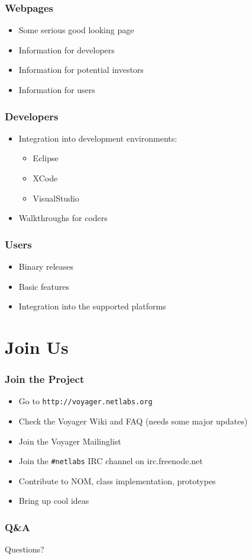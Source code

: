 \documentclass{beamer}
\begin{document}
\begin{frame}
\frametitle{Webpages}
\begin{itemize}
  \item Some serious good looking page
  \item Information for developers
  \item Information for potential investors
  \item Information for users
\end{itemize}
\end{frame}

\begin{frame}
\frametitle{Developers}
\begin{itemize}
  \item Integration into development environments:
  \begin{itemize}
    \item Eclipse
    \item XCode
    \item VisualStudio
  \end{itemize}
  \item Walkthroughs for coders 
\end{itemize}
\end{frame}

\begin{frame}
\frametitle{Users}
\begin{itemize}
  \item Binary releases
  \item Basic features
  \item Integration into the supported platforms
\end{itemize}
\end{frame}

\section{Join Us}
\begin{frame}
\frametitle{Join the Project}
\begin{itemize}
  \item Go to \texttt{http://voyager.netlabs.org}
  \item Check the Voyager Wiki and FAQ (needs some major updates)
  \item Join the Voyager Mailinglist
  \item Join the \texttt{\#netlabs} IRC channel on irc.freenode.net
  \item Contribute to NOM, class implementation, prototypes
  \item Bring up cool ideas
\end{itemize}
\end{frame}

\begin{frame}
\frametitle{Q\&A}
	Questions?
\end{frame}
\end{document}
